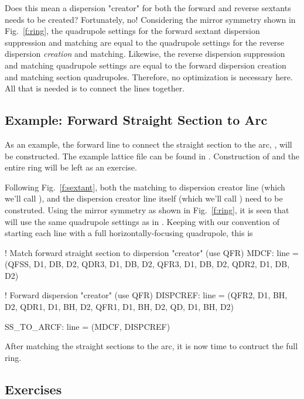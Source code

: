 \documentclass{hitec}     %
\begin{document}
{Does this mean a dispersion "creator" for both the forward and reverse sextants needs to be created? Fortunately, no! Considering the mirror symmetry shown in Fig.~\ref{f:ring}, the quadrupole settings for the forward sextant dispersion suppression and matching are equal to the quadrupole settings for the reverse dispersion \textit{creation} and matching. Likewise, the reverse dispersion suppression and matching quadrupole settings are equal to the forward dispersion creation and matching section quadrupoles. Therefore, no optimization is necessary here. All that is needed is to 
connect the lines together.

\subsection{Example: Forward Straight Section to Arc}

As an example, the forward line to connect the straight section to the arc, , will be constructed. 
The example lattice file can be found in . 
Construction of  and the entire ring will be left as an exercise.

Following Fig.~\ref{f:sextant}, both the matching to dispersion creator line (which we'll call ), and the dispersion creator line itself (which we'll call ) need to be construted. Using the mirror symmetry as shown in Fig.~\ref{f:ring}, it is seen that  will use the same quadrupole settings as in . Keeping with our convention of starting each line with a full horizontally-focusing quadrupole, this is 

\begin{code}
! Match forward straight section to dispersion "creator" (use QFR)
MDCF: line = (QFSS, D1, DB, D2, QDR3, D1, DB, D2,
              QFR3, D1, DB, D2, QDR2, D1, DB, D2) 

! Forward dispersion "creator" (use QFR)
DISPCREF: line = (QFR2, D1, BH, D2, QDR1, D1, BH, D2, 
                  QFR1, D1, BH, D2, QD, D1, BH, D2)

SS_TO_ARCF: line = (MDCF, DISPCREF)
\end{code}

After matching the straight sections to the arc, it is now time to contruct the full ring.

\subsection{Exercises} 

}
\end{document}
